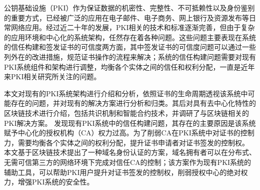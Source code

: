 
\begin{cabstract}





公钥基础设施（PKI）作为保证数据的机密性、完整性、不可抵赖性以及身份鉴别的重要方式，已经被广泛的应用在电子邮件、电子商务、网上银行及资源发布等日常网络应用。经过近二十年的发展，PKI相关的技术和标准逐渐完善，但由于复杂的应用环境和中心化的系统架构，任然存在着各种问题。这些问题主要表现在系统的信任构建和签发证书的可信度两方面，其中签发证书的可信度问题可以通过一些列外在的改进措施，规范证书操作的流程来解决；系统的信任构建问题需要对现有PKI系统组件和架构进行调整，均衡各个实体之间的信任和权利分配，一直是近年来PKI相关研究所关注的问题。


本文对现有的PKI系统架构进行介绍和分析，依照证书的生命周期透视该系统中可能存在的问题，并对现有的解决方案进行分析和归类。其后对具有去中心化特性的区块链技术进行介绍，包括共识机制和智能合约技术，并调研了与区块链相关的PKI解决方案。
发现现有PKI系统中的信任构建问题，其存在的主要原因是该系统赋予中心化的授权机构（CA）权力过高。为了削弱CA在PKI系统中对证书的控制力，需要均衡各个实体之间的权利分配，提升证书申请者对证书签发的控制权。
本文基于区块链技术提出了一种域名身份认证的方案，域名拥有者可以在分布式、无需可信第三方的网络环境下完成对信任CA的控制；该方案作为现有PKI系统的辅助工具，可以帮助PKI用户提升对证书签发的控制权，削弱授权中心的绝对权力，增强PKI系统的安全性。


\end{cabstract}
